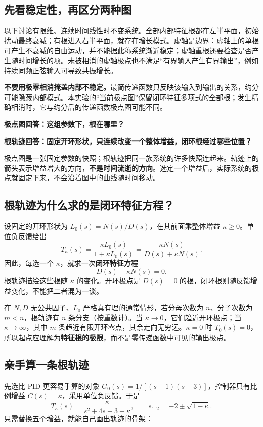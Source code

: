 \documentclass[UTF8,a4paper,11pt,fontset=windows]{ctexart}
\begin{document}
\newpage
\subsection{先看稳定性，再区分两种图}
以下讨论有限维、连续时间线性时不变系统。全部内部特征根都在左半平面，初始扰动最终衰减；有根进入右半平面，就存在增长模式。虚轴是边界：虚轴上的单根可产生不衰减的自由运动，并不能据此称系统渐近稳定；虚轴重根还要检查是否产生随时间增长的项。未被相消的虚轴极点也不满足“有界输入产生有界输出”，例如持续同频正弦输入可导致共振增长。

\textbf{不要用极零相消掩盖内部不稳定。}最简传递函数只反映该输入到输出的关系，约分可能隐藏内部模式。本实验的“当前极点图”保留闭环特征多项式的全部根；发生精确相消时，它与约分后的传递函数极点图可能不同。

\begin{keybox}
\textbf{极点图回答：这组参数下，根在哪里？}

\textbf{根轨迹回答：固定开环形状，只连续改变一个整体增益，闭环根经过哪些位置？}
\end{keybox}

极点图是一张固定参数的快照；根轨迹把同一族系统的许多快照连起来。轨迹上的箭头表示增益增大的方向，\textbf{不是时间流逝的方向}。选定一个增益后，实际系统的极点就固定下来，不会沿着图中的曲线随时间移动。

\subsection{根轨迹为什么求的是闭环特征方程？}
设固定的开环形状为 $L_0(s)=N(s)/D(s)$，在其前面乘整体增益 $\kappa\ge0$。单位负反馈给出
\[
  T_\kappa(s)=\frac{\kappa L_0(s)}{1+\kappa L_0(s)}
  =\frac{\kappa N(s)}{D(s)+\kappa N(s)}.
\]
因此，每选一个 $\kappa$，就求一次\textbf{闭环特征方程}
\[
  \boxed{D(s)+\kappa N(s)=0.}
\]
根轨迹描绘这些根随 $\kappa$ 的变化。开环极点是 $D(s)=0$ 的根，闭环根则随反馈增益变化，不能把二者混为一谈。

在 $N,D$ 无公共因子、$L_0$ 严格真有理的通常情形，若分母次数为 $n$、分子次数为 $m<n$，根轨迹有 $n$ 条分支（按重数计）。当 $\kappa\to0$，它们趋近开环极点；当 $\kappa\to\infty$，其中 $m$ 条趋近有限开环零点，其余走向无穷远。$\kappa=0$ 时 $T_0(s)=0$，所以起点应理解为\textbf{特征根的极限}，而不是零传递函数中可见的输出极点。

\newpage
\subsection{亲手算一条根轨迹}
先选比 PID 更容易手算的对象 $G_0(s)=1/[(s+1)(s+3)]$，控制器只有比例增益 $C(s)=\kappa$，采用单位负反馈。于是
\[
  T_\kappa(s)=\frac{\kappa}{s^2+4s+3+\kappa},
  \qquad s_{1,2}=-2\pm\sqrt{1-\kappa}.
\]
只需替换五个增益，就能自己画出轨迹的骨架：
\end{document}
